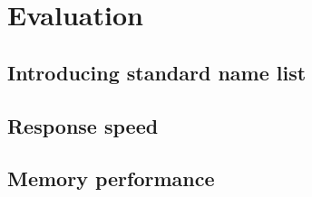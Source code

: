 \chapter{Evaluation}
\label{ch:evaluation}

\section{Introducing standard name list}

\section{Response speed}

\section{Memory performance}

